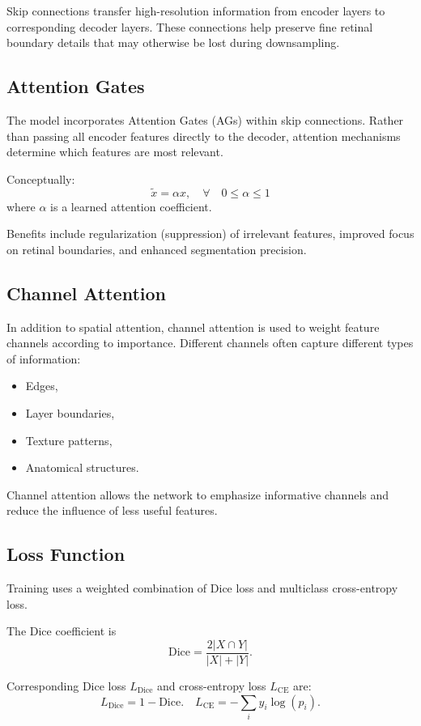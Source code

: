 \documentclass[11pt]{article}
\begin{document}
Skip connections transfer high-resolution information from encoder layers to corresponding decoder layers.
These connections help preserve fine retinal boundary details that may otherwise be lost during downsampling.

\subsection*{Attention Gates}

The model incorporates Attention Gates (AGs) within skip connections.
Rather than passing all encoder features directly to the decoder, attention mechanisms determine which features are most relevant.

Conceptually:\[\tilde{x}=\alpha x,\quad\forall \quad 0 \le \alpha \le 1\]
where $\alpha$ is a learned attention coefficient.

Benefits include regularization (suppression) of irrelevant features, improved focus on retinal boundaries, and enhanced segmentation precision.

\subsection*{Channel Attention}

In addition to spatial attention, channel attention is used to weight feature channels according to importance.
Different channels often capture different types of information:

\begin{itemize}
    \item Edges,
    \item Layer boundaries,
    \item Texture patterns,
    \item Anatomical structures.
\end{itemize}

Channel attention allows the network to emphasize informative channels and reduce the influence of less useful features.

\subsection*{Loss Function}

Training uses a weighted combination of Dice loss and multiclass cross-entropy loss.

The Dice coefficient is \[\text{Dice}=\frac{2|X\cap Y|}{|X|+|Y|}.\]

Corresponding Dice loss $L_{\text{Dice}}$ and cross-entropy loss $L_{\text{CE}}$ are:
\[L_{\text{Dice}}=1-\text{Dice}. \quad L_{\text{CE}}=-\sum_i y_i \log(p_i).\]
\end{document}

